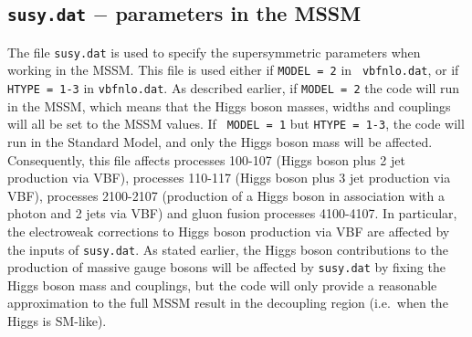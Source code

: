 \documentclass[english,12pt]{article}
\begin{document}
\begin{itemize}
\end{itemize}



\subsection{{\tt susy.dat} $-$ parameters in the MSSM}

The file {\tt susy.dat} is used to specify the supersymmetric parameters when
working in the MSSM.  This file is used either if {\tt MODEL = 2} in {\tt
vbfnlo.dat}, or if {\tt HTYPE = 1-3} in {\tt vbfnlo.dat}.  As described earlier,
if {\tt MODEL = 2} the code will run in the MSSM, which means that the Higgs
boson masses, widths and couplings will all be set to the MSSM values.  If {\tt
MODEL = 1} but {\tt HTYPE = 1-3}, the code will run in the Standard Model, and
only the Higgs boson mass will be affected.  Consequently, this file affects
processes 100-107 (Higgs boson plus 2 jet production via VBF), processes 110-117
(Higgs boson plus 3 jet production via VBF), processes 2100-2107 (production of
a Higgs boson in association with a photon and 2 jets via VBF) and gluon fusion
processes 4100-4107.  In particular, the electroweak corrections to Higgs boson
production via VBF are affected by the inputs of {\tt susy.dat}.  As stated
earlier, the Higgs boson contributions to the production of massive gauge bosons
will be affected by {\tt susy.dat} by fixing the Higgs boson mass and couplings,
but the code will only provide a reasonable approximation to the full MSSM
result in the decoupling region (i.e.\ when the Higgs is SM-like).
\end{document}

